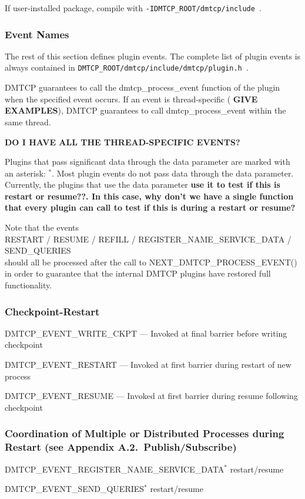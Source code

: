 \documentclass{article}
\begin{document}
If user-installed package, compile with {\tt -IDMTCP\_ROOT/dmtcp/include}~.

\subsubsection{Event Names}

The rest of this section defines plugin events.
The complete list of plugin events is always contained in
{\tt DMTCP\_ROOT/dmtcp/include/dmtcp/plugin.h}~.

DMTCP guarantees to call the dmtcp\_process\_event function of the plugin
when the specified event occurs.
If an event is thread-specific ({\bf
GIVE EXAMPLES}), DMTCP guarantees to call dmtcp\_process\_event within
the same thread.

{\bf DO I HAVE ALL THE THREAD-SPECIFIC EVENTS?}

Plugins that pass significant data through the data parameter
are marked with an asterisk: {}$^*$.
Most plugin events do not pass data through the data parameter.
Currently, the plugins
that use the data parameter {\bf use it to test if this is restart or resume??.
In this case, why don't we have a single function that every plugin can call
to test if this is during a restart or resume?}

Note that the events \\
   RESTART / RESUME / REFILL / REGISTER\_NAME\_SERVICE\_DATA / SEND\_QUERIES \\
should all be processed after the call to NEXT\_DMTCP\_PROCESS\_EVENT() in
order to guarantee that the internal DMTCP plugins have restored full
functionality.

\itemsep0pt
\subsubsection*{Checkpoint-Restart}
\begin{list}{}{\leftmargin=3em \itemindent=-2em}
\item
  DMTCP\_EVENT\_WRITE\_CKPT --- Invoked at final barrier before writing checkpoint
\item
  DMTCP\_EVENT\_RESTART --- Invoked at first barrier during restart of new process
\item
  DMTCP\_EVENT\_RESUME --- Invoked at first barrier during resume following checkpoint
\end{list}

\subsubsection*{Coordination of Multiple or Distributed Processes during Restart
	(see Appendix A.2.~Publish/Subscribe)}
\begin{list}{}{\leftmargin=3em \itemindent=-2em}
\item
  DMTCP\_EVENT\_REGISTER\_NAME\_SERVICE\_DATA$^*$ restart/resume
\item
  DMTCP\_EVENT\_SEND\_QUERIES$^*$ restart/resume
\end{list}
\end{document}
